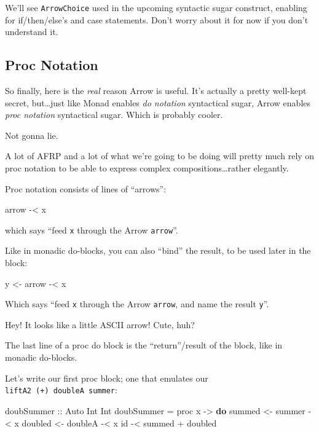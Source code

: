 \documentclass[]{article}
\newenvironment{Shaded}{}{}
\newcommand{\DataTypeTok}[1]{\textcolor[rgb]{0.56,0.13,0.00}{#1}}
\newcommand{\FunctionTok}[1]{\textcolor[rgb]{0.02,0.16,0.49}{#1}}
\newcommand{\KeywordTok}[1]{\textcolor[rgb]{0.00,0.44,0.13}{\textbf{#1}}}
\newcommand{\NormalTok}[1]{#1}
\newcommand{\OtherTok}[1]{\textcolor[rgb]{0.00,0.44,0.13}{#1}}
\begin{document}
We'll see \texttt{ArrowChoice} used in the upcoming syntactic sugar construct,
enabling for if/then/else's and case statements. Don't worry about it for now if
you don't understand it.

\hypertarget{proc-notation}{%
\subsection{Proc Notation}\label{proc-notation}}

So finally, here is the \emph{real} reason Arrow is useful. It's actually a
pretty well-kept secret, but\ldots{}just like Monad enables \emph{do notation}
syntactical sugar, Arrow enables \emph{proc notation} syntactical sugar. Which
is probably cooler.

Not gonna lie.

A lot of AFRP and a lot of what we're going to be doing will pretty much rely on
proc notation to be able to express complex compositions\ldots{}rather
elegantly.

Proc notation consists of lines of ``arrows'':

\begin{Shaded}
\begin{Highlighting}[]
\NormalTok{arrow }\FunctionTok{-<}\NormalTok{ x}
\end{Highlighting}
\end{Shaded}

which says ``feed \texttt{x} through the Arrow \texttt{arrow}''.

Like in monadic do-blocks, you can also ``bind'' the result, to be used later in
the block:

\begin{Shaded}
\begin{Highlighting}[]
\NormalTok{y }\OtherTok{<-}\NormalTok{ arrow }\FunctionTok{-<}\NormalTok{ x}
\end{Highlighting}
\end{Shaded}

Which says ``feed \texttt{x} through the Arrow \texttt{arrow}, and name the
result \texttt{y}''.

Hey! It looks like a little ASCII arrow! Cute, huh?

The last line of a proc do block is the ``return''/result of the block, like in
monadic do-blocks.

Let's write our first proc block; one that emulates our
\texttt{liftA2\ (+)\ doubleA\ summer}:

\begin{Shaded}
\begin{Highlighting}[]
\OtherTok{doubSummer ::} \DataTypeTok{Auto} \DataTypeTok{Int} \DataTypeTok{Int}
\NormalTok{doubSummer }\FunctionTok{=}\NormalTok{ proc x }\OtherTok{->} \KeywordTok{do}
\NormalTok{    summed  }\OtherTok{<-}\NormalTok{ summer  }\FunctionTok{-<}\NormalTok{ x}
\NormalTok{    doubled }\OtherTok{<-}\NormalTok{ doubleA }\FunctionTok{-<}\NormalTok{ x}
\NormalTok{    id }\FunctionTok{-<}\NormalTok{ summed }\FunctionTok{+}\NormalTok{ doubled}
\end{Highlighting}
\end{Shaded}
\end{document}
